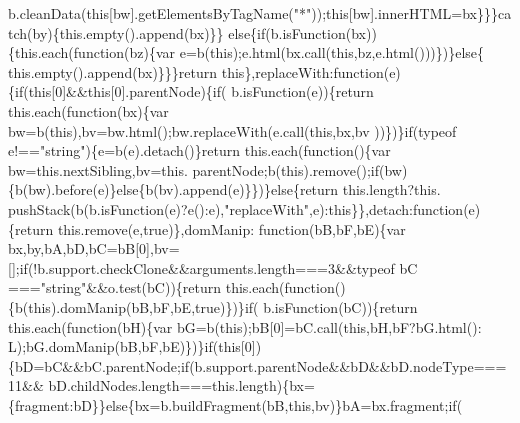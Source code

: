 \begin{DoxyCode}
{      b.cleanData(\textcolor{keyword}{this}[bw].getElementsByTagName(\textcolor{stringliteral}{"*"}));\textcolor{keyword}{this}[bw].innerHTML=bx\}\}\}\textcolor{keywordflow}{catch}(by)\{this.empty().append(bx)\}\}\textcolor{keywordflow}{
      else}\{\textcolor{keywordflow}{if}(b.isFunction(bx))\{this.each(\textcolor{keyword}{function}(bz)\{var e=b(\textcolor{keyword}{this});e.html(bx.call(\textcolor{keyword}{this},bz,e.html()))\})\}\textcolor{keywordflow}{else}\{
      this.empty().append(bx)\}\}\}\textcolor{keywordflow}{return} \textcolor{keyword}{this}\},replaceWith:\textcolor{keyword}{function}(e)\{\textcolor{keywordflow}{if}(\textcolor{keyword}{this}[0]&&\textcolor{keyword}{this}[0].parentNode)\{\textcolor{keywordflow}{if}(
      b.isFunction(e))\{\textcolor{keywordflow}{return} this.each(\textcolor{keyword}{function}(bx)\{var bw=b(\textcolor{keyword}{this}),bv=bw.html();bw.replaceWith(e.call(\textcolor{keyword}{this},bx,bv
      ))\})\}\textcolor{keywordflow}{if}(typeof e!==\textcolor{stringliteral}{"string"})\{e=b(e).detach()\}\textcolor{keywordflow}{return} this.each(\textcolor{keyword}{function}()\{var bw=this.nextSibling,bv=this.
      parentNode;b(\textcolor{keyword}{this}).remove();\textcolor{keywordflow}{if}(bw)\{b(bw).before(e)\}\textcolor{keywordflow}{else}\{b(bv).append(e)\}\})\}\textcolor{keywordflow}{else}\{\textcolor{keywordflow}{return} this.length?this.
      pushStack(b(b.isFunction(e)?e():e),\textcolor{stringliteral}{"replaceWith"},e):this\}\},detach:function(e)\{\textcolor{keywordflow}{return} this.\textcolor{keyword}{remove}(e,\textcolor{keyword}{true})\},domManip:\textcolor{keyword}{
      function}(bB,bF,bE)\{var bx,by,bA,bD,bC=bB[0],bv=[];\textcolor{keywordflow}{if}(!b.support.checkClone&&arguments.length===3&&typeof bC
      ===\textcolor{stringliteral}{"string"}&&o.test(bC))\{\textcolor{keywordflow}{return} this.each(\textcolor{keyword}{function}()\{b(\textcolor{keyword}{this}).domManip(bB,bF,bE,\textcolor{keyword}{true})\})\}\textcolor{keywordflow}{if}(
      b.isFunction(bC))\{\textcolor{keywordflow}{return} this.each(\textcolor{keyword}{function}(bH)\{var bG=b(\textcolor{keyword}{this});bB[0]=bC.call(\textcolor{keyword}{this},bH,bF?bG.html():
      L);bG.domManip(bB,bF,bE)\})\}\textcolor{keywordflow}{if}(\textcolor{keyword}{this}[0])\{bD=bC&&bC.parentNode;\textcolor{keywordflow}{if}(b.support.parentNode&&bD&&bD.nodeType===11&&
      bD.childNodes.length===\textcolor{keyword}{this}.length)\{bx=\{fragment:bD\}\}\textcolor{keywordflow}{else}\{bx=b.buildFragment(bB,\textcolor{keyword}{this},bv)\}bA=bx.fragment;\textcolor{keywordflow}{if}(
}
\end{DoxyCode}
